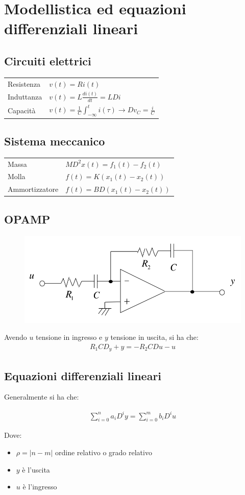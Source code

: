 \chapter{Modellistica ed equazioni differenziali lineari}

\section{Circuiti elettrici}

\begin{center}
  \begin{tabular}{|l l|}
  \hline
    Resistenza & $v(t) = Ri(t)$ \\
    Induttanza & $v(t) = L\frac{di(t)}{dt} = LDi$ \\
    Capacità & $v(t) = \frac{1}{C}\int_{-\infty}^t i(\tau) \rightarrow Dv_C = \frac{i}{C}$ \\
  \hline
  \end{tabular}
\end{center}

\section{Sistema meccanico}
\begin{center}
  \begin{tabular}{|l l|}
  \hline
    Massa & $MD^2x(t) = f_1(t)-f_2(t)$ \\
    Molla & $f(t) = K(x_1(t) - x_2(t))$ \\
    Ammortizzatore & $f(t) = BD(x_1(t) - x_2(t))$ \\
    \hline
  \end{tabular}
\end{center}



\section{OPAMP}
\begin{figure}[h!]
\centering
  \includegraphics[width=0.4\linewidth]{images/opamp.png}
\end{figure}
Avendo $u$ tensione in ingresso e $y$ tensione in uscita, si ha che:
\begin{align}
  R_1CD_y + y = -R_2CDu - u
\end{align}


\section{Equazioni differenziali lineari}
Generalmente si ha che:

\begin{align}
  \sum_{i=0}^n a_iD^iy = \sum_{i=0}^m b_iD^iu
\end{align}

Dove:
\begin{itemize}
  \item $\rho = |n - m|$ ordine relativo o grado relativo
  \item $y$ è l'uscita
  \item $u$ è l'ingresso
\end{itemize}
